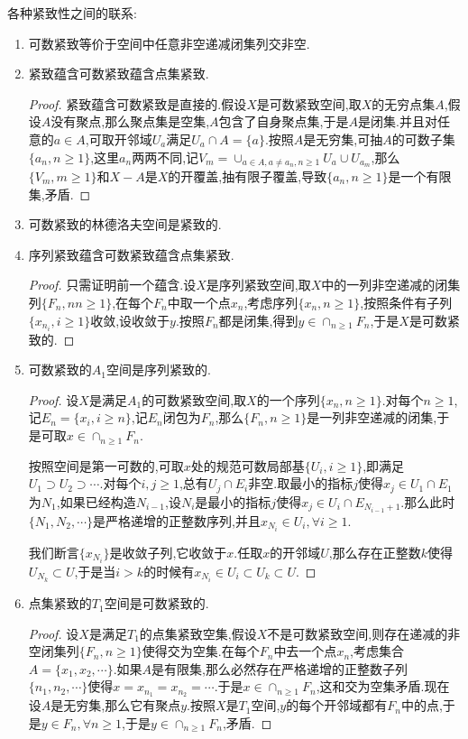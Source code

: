 各种紧致性之间的联系:
\begin{enumerate}
	\item 可数紧致等价于空间中任意非空递减闭集列交非空.
	\item 紧致蕴含可数紧致蕴含点集紧致.
	\begin{proof}
		
		紧致蕴含可数紧致是直接的.假设$X$是可数紧致空间,取$X$的无穷点集$A$,假设$A$没有聚点,那么聚点集是空集,$A$包含了自身聚点集,于是$A$是闭集.并且对任意的$a\in A$,可取开邻域$U_a$满足$U_a\cap A=\{a\}$.按照$A$是无穷集,可抽$A$的可数子集$\{a_n,n\ge1\}$,这里$a_n$两两不同,记$V_m=\cup_{a\in A,a\not=a_n,n\ge1}U_a\cup U_{a_m}$,那么$\{V_m,m\ge1\}$和$X-A$是$X$的开覆盖,抽有限子覆盖,导致$\{a_n,n\ge1\}$是一个有限集,矛盾.
	\end{proof}
	\item 可数紧致的林德洛夫空间是紧致的.
	\item 序列紧致蕴含可数紧致蕴含点集紧致.
	\begin{proof}
		
		只需证明前一个蕴含.设$X$是序列紧致空间,取$X$中的一列非空递减的闭集列$\{F_n,nn\ge1\}$,在每个$F_n$中取一个点$x_n$,考虑序列$\{x_n,n\ge1\}$,按照条件有子列$\{x_{n_i},i\ge1\}$收敛,设收敛于$y$.按照$F_n$都是闭集,得到$y\in\cap_{n\ge1}F_n$,于是$X$是可数紧致的.
	\end{proof}
	\item 可数紧致的$A_1$空间是序列紧致的.
	\begin{proof}
		
		设$X$是满足$A_1$的可数紧致空间,取$X$的一个序列$\{x_n,n\ge1\}$.对每个$n\ge1$,记$E_n=\{x_i,i\ge n\}$,记$E_n$闭包为$F_n$,那么$\{F_n,n\ge1\}$是一列非空递减的闭集,于是可取$x\in\cap_{n\ge1}F_n$.
		
		按照空间是第一可数的,可取$x$处的规范可数局部基$\{U_i,i\ge1\}$,即满足$U_1\supset U_2\supset\cdots$.对每个$i,j\ge1$,总有$U_j\cap E_i$非空.取最小的指标$j$使得$x_j\in U_1\cap E_1$为$N_1$,如果已经构造$N_{i-1}$,设$N_i$是最小的指标$j$使得$x_j\in U_i\cap E_{N_{i-1}+1}$.那么此时$\{N_1,N_2,\cdots\}$是严格递增的正整数序列,并且$x_{N_i}\in U_i,\forall i\ge1$.
		
		我们断言$\{x_{N_i}\}$是收敛子列,它收敛于$x$.任取$x$的开邻域$U$,那么存在正整数$k$使得$U_{N_k}\subset U$,于是当$i>k$的时候有$x_{N_i}\in U_i\subset U_k\subset U$.
	\end{proof}
	\item 点集紧致的$T_1$空间是可数紧致的.
	\begin{proof}
		
	设$X$是满足$T_1$的点集紧致空集,假设$X$不是可数紧致空间,则存在递减的非空闭集列$\{F_n,n\ge1\}$使得交为空集.在每个$F_n$中去一个点$x_n$,考虑集合$A=\{x_1,x_2,\cdots\}$.如果$A$是有限集,那么必然存在严格递增的正整数子列$\{n_1,n_2,\cdots\}$使得$x=x_{n_1}=x_{n_2}=\cdots$.于是$x\in\cap_{n\ge1}F_n$,这和交为空集矛盾.现在设$A$是无穷集,那么它有聚点$y$.按照$X$是$T_1$空间,$y$的每个开邻域都有$F_n$中的点,于是$y\in F_n,\forall n\ge1$,于是$y\in\cap_{n\ge1}F_n$,矛盾.
	\end{proof}
\end{enumerate}

